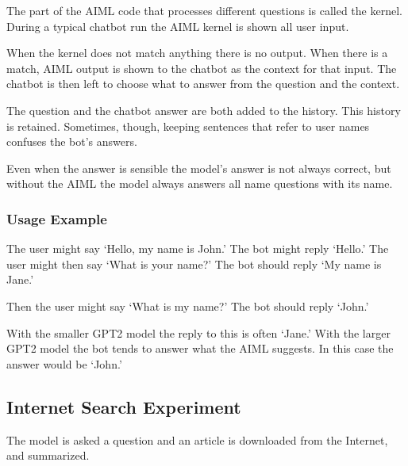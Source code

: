 The part of the AIML code that processes different questions is called the kernel.
During a typical chatbot run the AIML kernel is shown all user input.%

When the kernel does not match anything there is no output. When there is a match, AIML output is shown to the chatbot as the context for that input. 
The chatbot is then left to choose what to answer from the question and the context. 

The question and the chatbot answer are both added to the history. 
This history is retained. 
Sometimes, though, keeping sentences that refer to user names confuses the bot's answers.%

Even when the answer is sensible the model's answer is not always correct, but without the AIML the model always answers all name questions with its name. 


\subsubsection{Usage Example}

The user might say `Hello, my name is John.' The bot might reply `Hello.' The user might then say `What is your name?' The bot should reply `My name is Jane.'

Then the user might say `What is my name?' The bot should reply `John.'

With the smaller GPT2 model the reply to this is often `Jane.' %
With the larger GPT2 model the bot tends to answer what the AIML suggests. In this case the answer would be `John.'

\subsection{Internet Search Experiment}
The model is asked a question and an article is downloaded from the Internet, and summarized. %

